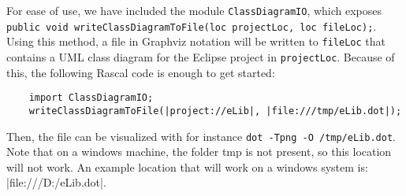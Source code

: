 	For ease of use, we have included the module \texttt{ClassDiagramIO}, which exposes \texttt{public void writeClassDiagramToFile(loc projectLoc, loc fileLoc);}.
	Using this method, a file in Graphviz notation will be written to \texttt{fileLoc} that contains a UML class diagram for the Eclipse project in \texttt{projectLoc}. Because of this, the following Rascal code is enough to get started:
	
	\begin{lstlisting}
	import ClassDiagramIO;
	writeClassDiagramToFile(|project://eLib|, |file:///tmp/eLib.dot|);
	\end{lstlisting}
	
	Then, the file can be visualized with for instance \texttt{dot -Tpng -O /tmp/eLib.dot}.
	Note that on a windows machine, the folder tmp is not present, so this location will not work. 
	An example location that will work on a windows system is: |file:///D:/eLib.dot|.

